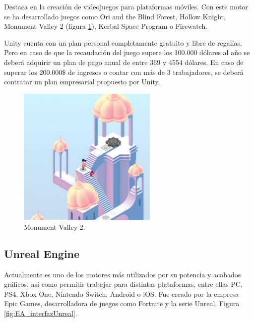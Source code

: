 Destaca en la creación de videojuegos para plataformas móviles. Con este motor se ha desarrollado juegos como Ori and the Blind Forest, Hollow Knight, Monument Valley 2 (figura \ref{fig:EA_monumentValley}), Kerbal Space Program o Firewatch.

Unity cuenta con un plan personal completamente gratuito y libre de regalías. Pero en caso de que la recaudación del juego supere los 100.000 dólares al año se deberá adquirir un plan de pago anual de entre 369 y 4554 dólares. En caso de superar los 200.000\$ de ingresos o contar con más de 3 trabajadores, se deberá contratar un plan empresarial propuesto por Unity. \cite{EA_engine_unityplanes}





\begin{figure}[H]
  \centering
\includegraphics[width=0.6\textwidth]{03.EstudioProblema/01.EstadoArte/00.Figuras/27.monument_valley_2.jpg}
    \caption{Monument Valley 2. \cite{EA_img_monumentValley}}
    \label{fig:EA_monumentValley}
\end{figure}


\subsection{Unreal Engine}

Actualmente es uno de los motores más utilizados por su potencia y acabados gráficos, así como permitir trabajar para distintas plataformas, entre ellas PC, PS4, Xbox One, Nintendo Switch, Android o iOS. Fue creado por la empresa Epic Games, desarrolladora de juegos como Fortnite y la serie Unreal. Figura \ref{fig:EA_interfazUnreal}.

